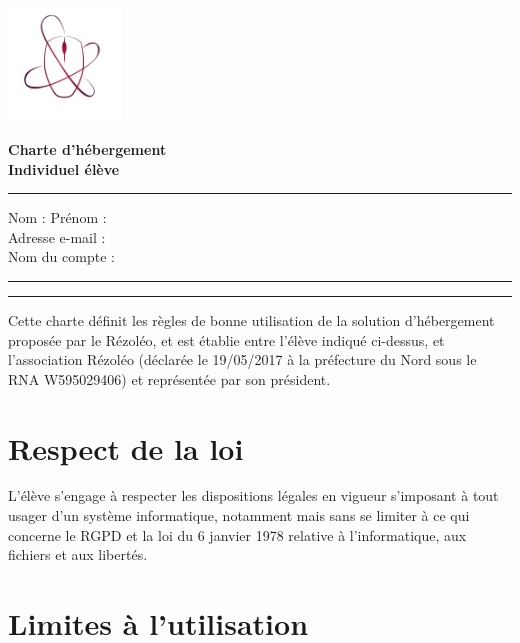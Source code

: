 \documentclass[12pt, a4paper]{article}
\begin{document}
\begin{center}
	\begin{minipage}{0.2\textwidth}
		\includegraphics[height=3cm]{rezoleo_logo.png}
	\end{minipage}
	\begin{minipage}{0.7\textwidth}
		\vspace{0.3cm}
		\Huge \textbf{Charte d'hébergement}\\
		\Huge \textbf{Individuel élève}
	\end{minipage}
\end{center}

\vspace*{0.5cm}

\hrule
\vspace{.5cm}
\noindent Nom : \makebox[8cm]{\dotfill}
Prénom : \dotfill
\vspace{.5cm}\\
Adresse e-mail : \dotfill
\vspace{.5cm}\\
Nom du compte : \dotfill\\
\hrule
\vspace{1cm}
\hrule
\vspace{1cm}

\noindent Cette charte définit les règles de bonne utilisation de la solution d'hébergement proposée par le Rézoléo, et est établie entre l'élève indiqué ci-dessus, et l'association Rézoléo (déclarée le 19/05/2017 à la préfecture du Nord sous le RNA W595029406) et représentée par son président.

\section{Respect de la loi}

L'élève s'engage à respecter les dispositions légales en vigueur s'imposant à tout usager d'un système informatique, notamment mais sans se limiter à ce qui concerne le RGPD et la loi du 6 janvier 1978 relative à l'informatique, aux fichiers et aux libertés.

\section{Limites à l'utilisation}
\end{document}
